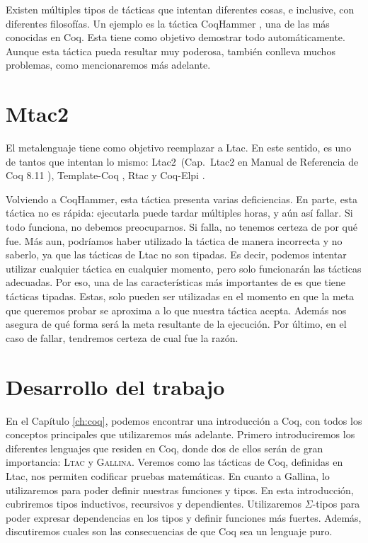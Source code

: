 Existen múltiples tipos de tácticas que intentan diferentes cosas, e inclusive, con diferentes filosofías.
Un ejemplo es la táctica CoqHammer \cite{DBLP:journals/jar/CzajkaK18}, una de las más conocidas en Coq. Esta tiene como objetivo demostrar todo automáticamente.
Aunque esta táctica pueda resultar muy poderosa, también conlleva muchos problemas, como mencionaremos más adelante.

\section{Mtac2}

El metalenguaje \Mtac \cite{DBLP:journals/pacmpl/KaiserZKRD18} tiene como objetivo reemplazar a Ltac.
En este sentido, es uno de tantos que intentan lo mismo: Ltac2~(Cap.~Ltac2 en Manual de Referencia de Coq 8.11 \cite{Coq}), Template-Coq \cite{DBLP:conf/itp/AnandBCST18}, Rtac \cite{DBLP:conf/esop/MalechaB16} y Coq-Elpi \cite{tassi:hal-01637063}.

Volviendo a CoqHammer, esta táctica presenta varias deficiencias.
En parte, esta táctica no es rápida: ejecutarla puede tardar múltiples horas, y aún así fallar.
Si todo funciona, no debemos preocuparnos.
Si falla, no tenemos certeza de por qué fue.
Más aun, podríamos haber utilizado la táctica de manera incorrecta y no saberlo, ya que las tácticas de Ltac no son tipadas.
Es decir, podemos intentar utilizar cualquier táctica en cualquier momento, pero solo funcionarán las tácticas adecuadas.
Por eso, una de las características más importantes de \mtac es que tiene tácticas tipadas.
Estas, solo pueden ser utilizadas en el momento en que la meta que queremos probar se aproxima a lo que nuestra táctica acepta.
Además nos asegura de qué forma será la meta resultante de la ejecución.
Por último, en el caso de fallar, tendremos certeza de cual fue la razón.


\section{Desarrollo del trabajo}

En el Capítulo \ref{ch:coq}, podemos encontrar una introducción a Coq, con todos los conceptos principales que utilizaremos más adelante.
Primero introduciremos los diferentes lenguajes que residen en Coq, donde dos de ellos serán de gran importancia: \textsc{Ltac} y \textsc{Gallina}.
Veremos como las tácticas de Coq, definidas en Ltac, nos permiten codificar pruebas matemáticas.
En cuanto a Gallina, lo utilizaremos para poder definir nuestras funciones y tipos.
En esta introducción, cubriremos tipos inductivos, recursivos y dependientes.
Utilizaremos $\Sigma$-tipos para poder expresar dependencias en los tipos y definir funciones más fuertes.
Además, discutiremos cuales son las consecuencias de que Coq sea un lenguaje puro.


